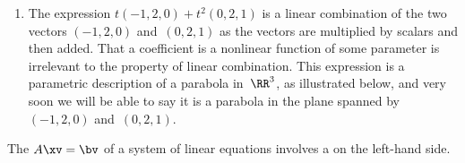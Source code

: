 \begin{example}
\begin{enumerate}
\item 
The expression \(t(-1,2,0)+t^2(0,2,1)\)
is a linear combination of the two vectors \((-1,2,0)\) and~\((0,2,1)\) as the vectors are multiplied by scalars and then added.  
That a coefficient is a nonlinear function of some parameter is irrelevant to the property of linear combination.
This expression is a parametric description of a parabola in~\(\RR^3\), as illustrated below, and very soon we will be able to say it is a parabola in the plane spanned by \((-1,2,0)\) and~\((0,2,1)\).
\begin{center}
 {}
\end{center}

\end{enumerate}
\end{example}



The  \(A\xv=\bv\) of a system of linear equations involves a  on the left-hand side.

